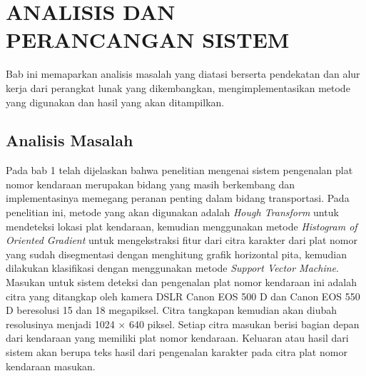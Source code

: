 \chapter{ANALISIS DAN PERANCANGAN SISTEM}

%
\vspace{4.5pt}

\noindent Bab ini memaparkan analisis masalah yang diatasi berserta pendekatan dan alur kerja dari perangkat lunak yang dikembangkan, mengimplementasikan metode yang digunakan dan hasil yang akan ditampilkan.
\\
\section{Analisis Masalah}
\noindent Pada bab 1 telah dijelaskan bahwa penelitian mengenai sistem pengenalan plat nomor kendaraan merupakan bidang yang masih berkembang dan implementasinya memegang peranan penting dalam bidang transportasi. Pada penelitian ini, metode yang akan digunakan adalah \textit{Hough Transform} untuk mendeteksi lokasi plat kendaraan, kemudian menggunakan metode \textit{Histogram of Oriented Gradient} untuk mengekstraksi fitur dari citra karakter dari plat nomor yang sudah disegmentasi dengan menghitung grafik horizontal pita, kemudian dilakukan klasifikasi dengan menggunakan metode \textit{Support Vector Machine}.
\noindent Masukan untuk sistem deteksi dan pengenalan plat nomor kendaraan ini adalah citra yang ditangkap oleh kamera DSLR Canon EOS 500 D dan Canon EOS 550 D beresolusi 15 dan 18 megapiksel. Citra tangkapan kemudian akan diubah resolusinya menjadi 1024 $\times$ 640 piksel. Setiap citra masukan berisi bagian depan dari kendaraan yang memiliki plat nomor kendaraan.
\noindent Keluaran atau hasil dari sistem akan berupa teks hasil dari pengenalan karakter pada citra plat nomor kendaraan masukan.\\ 

